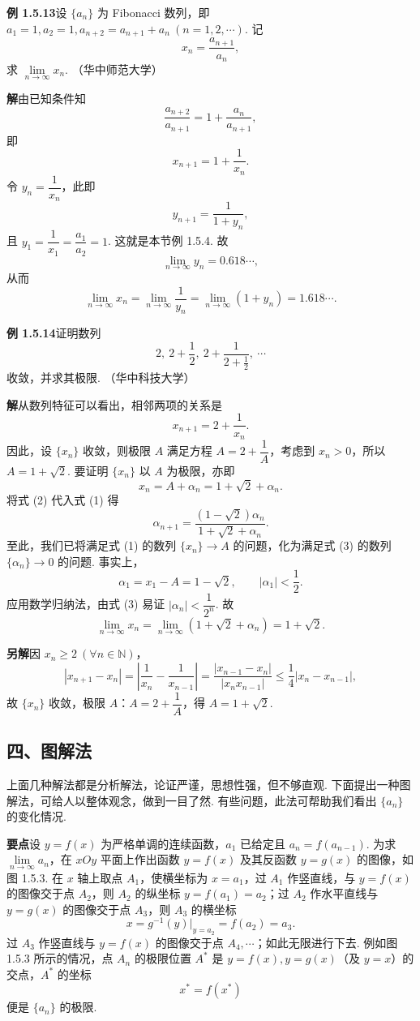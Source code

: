 \documentclass[UTF8,12pt,a4paper,fontset=fandol]{ctexart}
\begin{document}
\noindent\textbf{例 1.5.13}\quad 设 $\{a_n\}$ 为 Fibonacci 数列，即 $a_1=1,a_2=1,a_{n+2}=a_{n+1}+a_n\ (n=1,2,\cdots)$. 记
\[
  x_n=\frac{a_{n+1}}{a_n},
\]
求 $\lim\limits_{n\to\infty}x_n$. （华中师范大学）

\noindent\textbf{解}\quad 由已知条件知
\[
  \frac{a_{n+2}}{a_{n+1}}=1+\frac{a_n}{a_{n+1}},
\]
即
\[
  x_{n+1}=1+\frac1{x_n}.
\]
令 $y_n=\dfrac1{x_n}$，此即
\[
  y_{n+1}=\frac1{1+y_n},
\]
且 $y_1=\dfrac1{x_1}=\dfrac{a_1}{a_2}=1$. 这就是本节例 1.5.4. 故
\[
  \lim_{n\to\infty}y_n=0.618\cdots,
\]
从而
\[
  \lim_{n\to\infty}x_n
  =\lim_{n\to\infty}\frac1{y_n}
  =\lim_{n\to\infty}(1+y_n)
  =1.618\cdots.
\]

\noindent\textbf{例 1.5.14}\quad 证明数列
\[
  2,\ 2+\frac12,\ 2+\frac{1}{2+\frac12},\ \cdots
\]
收敛，并求其极限. （华中科技大学）

\noindent\textbf{解}\quad 从数列特征可以看出，相邻两项的关系是
\[
  x_{n+1}=2+\frac1{x_n}.
\tag{1}
\]
因此，设 $\{x_n\}$ 收敛，则极限 $A$ 满足方程 $A=2+\dfrac1A$，考虑到 $x_n>0$，所以 $A=1+\sqrt2$. 要证明 $\{x_n\}$ 以 $A$ 为极限，亦即
\[
  x_n=A+\alpha_n=1+\sqrt2+\alpha_n.
\tag{2}
\]
将式 (2) 代入式 (1) 得
\[
  \alpha_{n+1}=\frac{(1-\sqrt2)\alpha_n}{1+\sqrt2+\alpha_n}.
\tag{3}
\]
至此，我们已将满足式 (1) 的数列 $\{x_n\}\to A$ 的问题，化为满足式 (3) 的数列 $\{\alpha_n\}\to 0$ 的问题. 事实上，
\[
  \alpha_1=x_1-A=1-\sqrt2,\qquad |\alpha_1|<\frac12.
\]
应用数学归纳法，由式 (3) 易证 $|\alpha_n|<\dfrac1{2^n}$. 故
\[
  \lim_{n\to\infty}x_n
  =\lim_{n\to\infty}(1+\sqrt2+\alpha_n)
  =1+\sqrt2.
\]

\noindent\textbf{另解}\quad 因 $x_n\ge 2\ (\forall n\in\mathbb{N})$，
\[
  |x_{n+1}-x_n|
  =\left|\frac1{x_n}-\frac1{x_{n-1}}\right|
  =\frac{|x_{n-1}-x_n|}{|x_nx_{n-1}|}
  \le \frac14 |x_n-x_{n-1}|,
\]
故 $\{x_n\}$ 收敛，极限 $A$：$A=2+\dfrac1A$，得 $A=1+\sqrt2$.

\subsection*{四、图解法}

上面几种解法都是分析解法，论证严谨，思想性强，但不够直观. 下面提出一种图解法，可给人以整体观念，做到一目了然. 有些问题，此法可帮助我们看出 $\{a_n\}$ 的变化情况.

\noindent\textbf{要点}\quad 设 $y=f(x)$ 为严格单调的连续函数，$a_1$ 已给定且 $a_n=f(a_{n-1})$. 为求 $\lim\limits_{n\to\infty}a_n$，在 $xOy$ 平面上作出函数 $y=f(x)$ 及其反函数 $y=g(x)$ 的图像，如图 1.5.3. 在 $x$ 轴上取点 $A_1$，使横坐标为 $x=a_1$，过 $A_1$ 作竖直线，与 $y=f(x)$ 的图像交于点 $A_2$，则 $A_2$ 的纵坐标 $y=f(a_1)=a_2$；过 $A_2$ 作水平直线与 $y=g(x)$ 的图像交于点 $A_3$，则 $A_3$ 的横坐标
\[
  x=g^{-1}(y)\big|_{y=a_2}=f(a_2)=a_3.
\]
过 $A_3$ 作竖直线与 $y=f(x)$ 的图像交于点 $A_4,\cdots$；如此无限进行下去. 例如图 1.5.3 所示的情况，点 $A_n$ 的极限位置 $A^*$ 是 $y=f(x),y=g(x)$（及 $y=x$）的交点，$A^*$ 的坐标
\[
  x^*=f(x^*)
\]
便是 $\{a_n\}$ 的极限.
\end{document}
